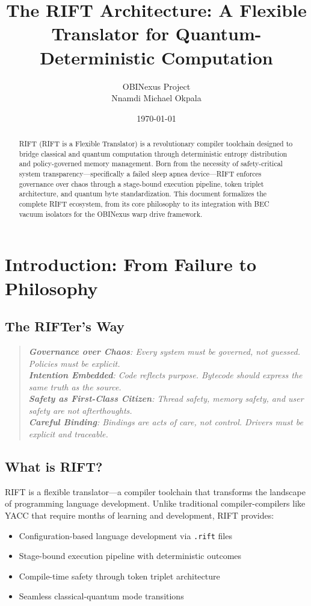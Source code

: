 \documentclass[12pt]{article}
\title{The RIFT Architecture: A Flexible Translator for Quantum-Deterministic Computation}
\author{OBINexus Project\\
Nnamdi Michael Okpala}
\date{\today}
\newenvironment{hodos}{\begin{quote}\itshape}{\end{quote}}
\begin{document}
\maketitle

\begin{abstract}
RIFT (RIFT is a Flexible Translator) is a revolutionary compiler toolchain designed to bridge classical and quantum computation through deterministic entropy distribution and policy-governed memory management. Born from the necessity of safety-critical system transparency—specifically a failed sleep apnea device—RIFT enforces governance over chaos through a stage-bound execution pipeline, token triplet architecture, and quantum byte standardization. This document formalizes the complete RIFT ecosystem, from its core philosophy to its integration with BEC vacuum isolators for the OBINexus warp drive framework.
\end{abstract}

\section{Introduction: From Failure to Philosophy}

\subsection{The RIFTer's Way}
\begin{hodos}
\textbf{Governance over Chaos}: Every system must be governed, not guessed. Policies must be explicit.\\[0.5em]
\textbf{Intention Embedded}: Code reflects purpose. Bytecode should express the same truth as the source.\\[0.5em]
\textbf{Safety as First-Class Citizen}: Thread safety, memory safety, and user safety are not afterthoughts.\\[0.5em]
\textbf{Careful Binding}: Bindings are acts of care, not control. Drivers must be explicit and traceable.
\end{hodos}

\subsection{What is RIFT?}
RIFT is a flexible translator—a compiler toolchain that transforms the landscape of programming language development. Unlike traditional compiler-compilers like YACC that require months of learning and development, RIFT provides:
\begin{itemize}
\item Configuration-based language development via \texttt{.rift} files
\item Stage-bound execution pipeline with deterministic outcomes
\item Compile-time safety through token triplet architecture
\item Seamless classical-quantum mode transitions
\end{itemize}
\end{document}
